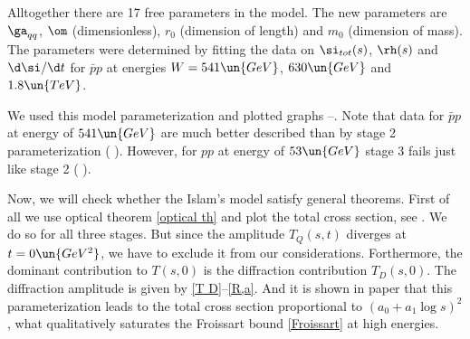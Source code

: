 Alltogether there are 17 free parameters in the model. The new parameters are $\ga_{qq}$, $\om$ (dimensionless), $r_0$ (dimension of length) and $m_0$ (dimension of mass). The parameters were determined by fitting the data on $\si_{tot}(s)$, $\rh(s)$ and $\d\si/\d t$ for $\bar pp$ at energies $W = 541\un{GeV}$, $630\un{GeV}$ and $1.8\un{TeV}$.

We used this model parameterization and plotted graphs --. Note that data for $\bar pp$ at energy of $541\un{GeV}$ are much better described than by stage 2 parameterization (\fg{} ). However, for $pp$ at energy of $53\un{GeV}$ stage 3 fails just like stage 2 (\fg{} ).

\bmfig
{}%
%
\emfig

Now, we will check whether the Islam's model satisfy general theorems. First of all we use optical theorem \ref{optical th} and plot the total cross section, see \fg{} . We do so for all three stages. But since the amplitude $T_Q(s, t)$ diverges at $t = 0\un{GeV^2}$, we have to exclude it from our considerations. Forthermore, the dominant contribution to $T(s, 0)$ is the diffraction contribution $T_D(s, 0)$. The diffraction amplitude is given by \equs{} \ref{T D}--\ref{R,a}. And it is shown in paper  that this parameterization leads to the total cross section proportional to $(a_0 + a_1 \log s)^2$, what qualitatively saturates the Froissart bound \ref{Froissart} at high energies.

\bmfig
{}%
\emfig

